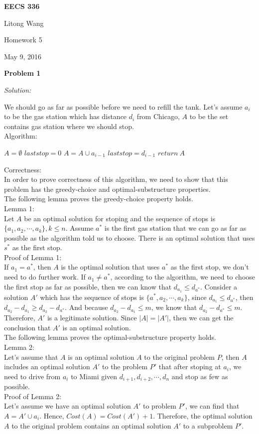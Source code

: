 \documentclass[12pt,letterpaper]{article}
\def\pp{\par\noindent}
\newcommand{\problem}[1]{ \bigskip \pp \textbf{Problem #1}\par}
\newcommand{\solution}{\textit{Solution:}\par}
\begin{document}
\centerline{\bf EECS 336}

\medskip
\centerline{Litong Wang}
\centerline{Homework 5}
\centerline{May 9, 2016}
\bigskip


\problem{1}
\solution
We should go as far as possible before we need to refill the tank. Let's assume $a_i$ to be the gas station which has distance $d_i$ from Chicago, $A$ to be the set contains gas station where we should stop. \\
Algorithm: \\
\begin{algorithm}[H]
$ A = \emptyset $ \;
$ laststop = 0 $ \;
{
  {
	$A = A \cup a_{i-1}$ \;
	$laststop = d_{i-1}$ \;
	}
}
   $return\  A$ \;
\end{algorithm}
Correctness: \\
In order to prove correctness of this algorithm, we need to show that this problem has the greedy-choice and optimal-substructure properties. \\
The following lemma proves the greedy-choice property holds. \\
Lemma 1: \\
Let $A$ be an optimal solution for stoping and the sequence of stops is $\{ a_1, a_2, \cdots, a_k \}, k \le n$. Assume $a^*$ is the first gas station that we can go as far as possible as the algorithm told us to choose. There is an optimal solution that uses $s^*$ as the first stop. \\
Proof of Lemma 1: \\
If $a_1 = a^*$, then $A$ is the optimal solution that uses $a^*$ as the first stop, we don't need to do further work. If $a_1 \neq a^*$, according to the algorithm, we need to choose the first stop as far as possible, then we can know that $d_{a_1} \le d_{a^*}$. Consider a solution $A'$ which has the sequence of stops is $\{a^*, a_2,\cdots, a_k \}$, since $d_{a_1} \le d_{a^*}$, then $d_{a_2} - d_{a_1} \ge d_{a_2} - d_{a^*}$. And because $d_{a_2} - d_{a_1} \le m$, we know that $d_{a_2} - d_{a^*} \le m$. Therefore, $A'$ is a legitimate solution. Since $|A| = |A'|$, then we can get the conclusion that $A'$ is an optimal solution. \\
The following lemma proves the optimal-substructure property holds. \\
Lemma 2: \\
Let's assume that $A$ is an optimal solution $A$ to the original problem $P$, then $A$ includes an optimal solution $A'$ to the problem $P'$ that after stoping at $a_i$, we need to drive from $a_i$ to Miami given $d_{i+1}, d_{i+2}, \cdots,d_n$ and stop as few as possible. \\
Proof of Lemma 2: \\
Let's assume we have an optimal solution $A'$ to problem $P'$, we can find that $A = A' \cup a_i$. Hence, $Cost(A) = Cost(A') + 1$. Therefore, the optimal solution $A$ to the original problem contains an optimal solution $A'$ to a subproblem $P'$.
\end{document}
